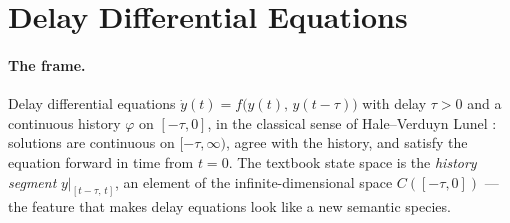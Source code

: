 

\section{Delay Differential Equations}
\label{sec:mt-dde}

\paragraph{The frame.} Delay differential equations $\dot y(t) =
f\bigl(y(t),\, y(t - \tau)\bigr)$ with delay $\tau > 0$ and a
continuous history $\varphi$ on $[-\tau, 0]$, in the classical sense
of Hale--Verduyn Lunel \cite{hale-verduyn-lunel-1993}: solutions are
continuous on $[-\tau, \infty)$, agree with the history, and satisfy
the equation forward in time from $t = 0$.  The textbook state space
is the \emph{history segment} $y|_{[t-\tau,\,t]}$, an element of the
infinite-dimensional space $C([-\tau, 0])$ --- the feature that makes
delay equations look like a new semantic species.

